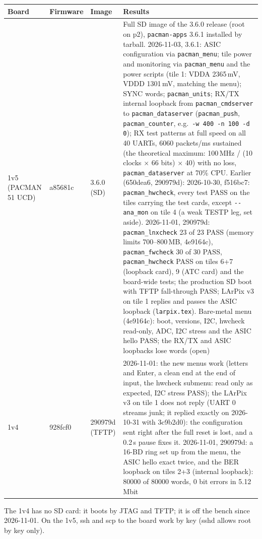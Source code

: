 \documentclass[11pt]{article}
\newcommand{\h}[1]{\texttt{#1}}
\begin{document}
\begin{center}
\begin{tabularx}{\linewidth}{@{}lllL@{}}
\toprule
Board & Firmware & Image & Results \\
\midrule
1v5 (PACMAN 51 UCD) & a85681c & 3.6.0 (SD) & Full SD image of the 3.6.0 release (root on p2), \h{pacman-apps}
  3.6.1 installed by tarball.  2026-11-03, 3.6.1: ASIC configuration via \h{pacman\_menu}; tile power and monitoring via
  \h{pacman\_menu} and the power scripts (tile 1: VDDA 2365\,mV, VDDD 1301\,mV, matching the menu); SYNC words;
  \h{pacman\_units}; RX/TX internal loopback from \h{pacman\_cmdserver} to \h{pacman\_dataserver}
  (\h{pacman\_push}, \h{pacman\_counter}, e.g.\ \h{-w 400 -n 100 -d 0}); RX test patterns at full speed on all 40
  UARTs, 6060 packets/ms sustained (the theoretical maximum: 100\,MHz / (10 clocks $\times$ 66 bits) $\times$ 40) with
  no loss, \h{pacman\_dataserver} at 70\% CPU.  Earlier (650dea6, 290979d): 2026-10-30, f516bc7:
  \h{pacman\_hwcheck}, every test PASS on the tiles carrying the test cards, except \h{-{}-ana\_mon} on tile 4 (a weak
  TESTP leg, set aside).  2026-11-01, 290979d: \h{pacman\_lnxcheck} 23 of 23 PASS (memory limits 700--800\,MB,
  4e9164c), \h{pacman\_fwcheck} 30 of 30 PASS, \h{pacman\_hwcheck} PASS on tiles 6+7 (loopback card), 9 (ATC card)
  and the board-wide tests; the production SD boot with TFTP fall-through PASS; LArPix v3 on tile 1 replies and
  passes the ASIC loopback (\h{larpix.tex}).  Bare-metal menu (4e9164c): boot, versions, I2C, hwcheck read-only,
  ADC, I2C stress and the ASIC hello PASS; the RX/TX and ASIC loopbacks lose words (open) \\
1v4 & 928fcf0 & 290979d (TFTP) & 2026-11-01: the new menus work (letters and Enter, a clean end at the end of
  input, the hwcheck submenu: read only as expected, I2C stress PASS); the LArPix v3 on tile 1 does not reply
  (UART 0 streams junk; it replied exactly on 2026-10-31 with 3c9b2d0): the configuration sent right after the full
  reset is lost, and a 0.2\,s pause fixes it.  2026-11-01, 290979d: a 16-BD ring set up from the menu, the ASIC hello
  exact twice, and the BER loopback on tiles 2+3 (internal loopback): 80000 of 80000 words, 0 bit errors in
  5.12\,Mbit \\
\bottomrule
\end{tabularx}
\end{center}

\noindent The 1v4 has no SD card: it boots by JTAG and TFTP; it is off the bench since 2026-11-01.  On the 1v5, ssh
and scp to the board work by key (sshd allows root by key only).
\end{document}
